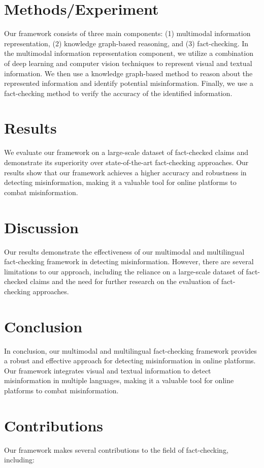 \documentclass{article}
\begin{document}
\section{Methods/Experiment}
Our framework consists of three main components: (1) multimodal information representation, (2) knowledge graph-based reasoning, and (3) fact-checking. In the multimodal information representation component, we utilize a combination of deep learning and computer vision techniques to represent visual and textual information. We then use a knowledge graph-based method to reason about the represented information and identify potential misinformation. Finally, we use a fact-checking method to verify the accuracy of the identified information.

\section{Results}
We evaluate our framework on a large-scale dataset of fact-checked claims and demonstrate its superiority over state-of-the-art fact-checking approaches. Our results show that our framework achieves a higher accuracy and robustness in detecting misinformation, making it a valuable tool for online platforms to combat misinformation.

\section{Discussion}
Our results demonstrate the effectiveness of our multimodal and multilingual fact-checking framework in detecting misinformation. However, there are several limitations to our approach, including the reliance on a large-scale dataset of fact-checked claims and the need for further research on the evaluation of fact-checking approaches.

\section{Conclusion}
In conclusion, our multimodal and multilingual fact-checking framework provides a robust and effective approach for detecting misinformation in online platforms. Our framework integrates visual and textual information to detect misinformation in multiple languages, making it a valuable tool for online platforms to combat misinformation.

\section{Contributions}
Our framework makes several contributions to the field of fact-checking, including:
\end{document}
